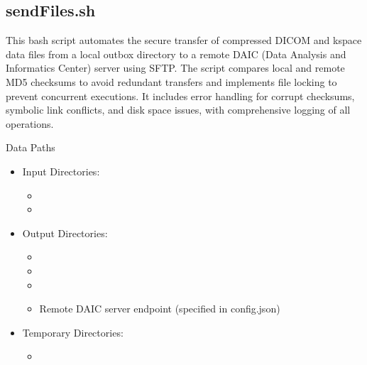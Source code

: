 \documentclass[letterpaper,10pt,english]{sphinxmanual}
\begin{document}
\sphinxstepscope


\subsection{sendFiles.sh}
\label{\detokenize{Architecture/scripts/sendFiles:sendfiles-sh}}\label{\detokenize{Architecture/scripts/sendFiles::doc}}
\sphinxAtStartPar
This bash script automates the secure transfer of compressed DICOM and k\sphinxhyphen{}space data files from a local outbox directory to a remote DAIC (Data Analysis and Informatics Center) server using SFTP. The script compares local and remote MD5 checksums to avoid redundant transfers and implements file locking to prevent concurrent executions. It includes error handling for corrupt checksums, symbolic link conflicts, and disk space issues, with comprehensive logging of all operations.

\sphinxAtStartPar
{}


\sphinxAtStartPar
{}


\sphinxAtStartPar
Data Paths
\begin{itemize}
\item {} 
\sphinxAtStartPar
Input Directories:
\begin{itemize}
\item {} 
\sphinxAtStartPar
{}

\item {} 
\sphinxAtStartPar
{}

\end{itemize}

\item {} 
\sphinxAtStartPar
Output Directories:
\begin{itemize}
\item {} 
\sphinxAtStartPar
{}

\item {} 
\sphinxAtStartPar
{}

\item {} 
\sphinxAtStartPar
{}

\item {} 
\sphinxAtStartPar
Remote DAIC server endpoint (specified in config.json)

\end{itemize}

\item {} 
\sphinxAtStartPar
Temporary Directories:
\begin{itemize}
\item {} 
\sphinxAtStartPar
{}

\end{itemize}

\end{itemize}
\end{document}
